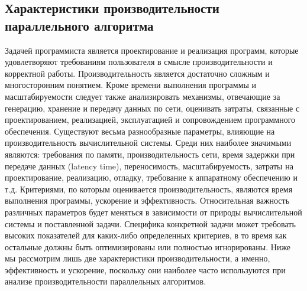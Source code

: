 \subsection{Характеристики производительности параллельного алгоритма}
Задачей программиста является проектирование и реализация программ, которые удовлетворяют требованиям пользователя в смысле производительности и корректной работы. Производительность является достаточно сложным и многосторонним понятием. Кроме времени выполнения программы и масштабируемости следует также анализировать механизмы, отвечающие за генерацию, хранение и передачу данных по сети, оценивать затраты, связанные с проектированием, реализацией, эксплуатацией и сопровождением программного обеспечения. Существуют весьма разнообразные параметры, влияющие на производительность вычислительной системы. Среди них наиболее значимыми являются: требования по памяти, производительность сети, время задержки при передаче данных (latency time), переносимость, масштабируемость, затраты на проектирование, реализацию, отладку, требование к аппаратному обеспечению и т.д. Критериями, по которым оценивается производительность, являются время выполнения программы, ускорение и эффективность.
Относительная важность различных параметров будет меняться в  зависимости от природы вычислительной системы и поставленной задачи. Специфика конкретной задачи может требовать высоких показателей для каких-либо определенных критериев, в то время как остальные должны быть оптимизированы или полностью игнорированы. 
Ниже мы рассмотрим лишь две характеристики производительности, а именно, эффективность и ускорение, поскольку они наиболее часто используются при анализе производительности параллельных алгоритмов.
